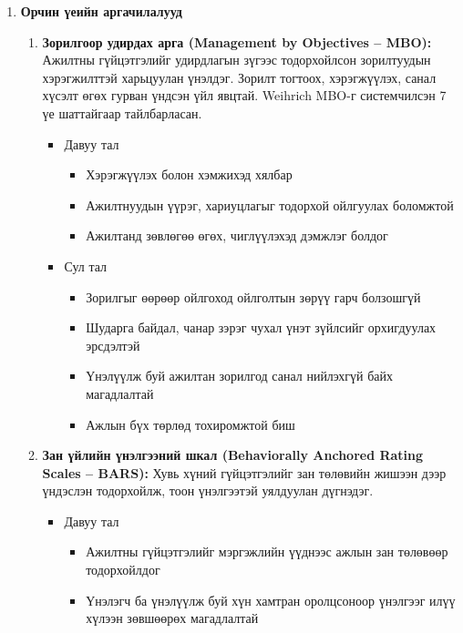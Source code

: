 \begin{enumerate}
\begin{enumerate}
    \end{enumerate}
    \item \textbf{Орчин үеийн аргачилалууд}
    \begin{enumerate}
        \item \textbf{Зорилгоор удирдах арга (Management by Objectives – MBO):} Ажилтны гүйцэтгэлийг 
        удирдлагын зүгээс тодорхойлсон зорилтуудын хэрэгжилттэй харьцуулан үнэлдэг. Зорилт тогтоох, 
        хэрэгжүүлэх, санал хүсэлт өгөх гурван үндсэн үйл явцтай. Weihrich MBO-г системчилсэн 7 үе 
        шаттайгаар тайлбарласан.
        \begin{itemize}
            \item Давуу тал
            \begin{itemize}
                \item Хэрэгжүүлэх болон хэмжихэд хялбар
                \item Ажилтнуудын үүрэг, хариуцлагыг тодорхой ойлгуулах боломжтой
                \item Ажилтанд зөвлөгөө өгөх, чиглүүлэхэд дэмжлэг болдог
            \end{itemize}
            \item Сул тал
            \begin{itemize}
                \item Зорилгыг өөрөөр ойлгоход ойлголтын зөрүү гарч болзошгүй
                \item Шударга байдал, чанар зэрэг чухал үнэт зүйлсийг орхигдуулах эрсдэлтэй
                \item Үнэлүүлж буй ажилтан зорилгод санал нийлэхгүй байх магадлалтай
                \item Ажлын бүх төрлөд тохиромжтой биш
            \end{itemize}
        \end{itemize}
        \item \textbf{Зан үйлийн үнэлгээний шкал (Behaviorally Anchored Rating Scales – BARS):} Хувь хүний 
        гүйцэтгэлийг зан төлөвийн жишээн дээр үндэслэн тодорхойлж, тоон үнэлгээтэй уялдуулан дүгнэдэг.
        \begin{itemize}
            \item Давуу тал
            \begin{itemize}
                \item Ажилтны гүйцэтгэлийг мэргэжлийн үүднээс ажлын зан төлөвөөр тодорхойлдог
                \item Үнэлэгч ба үнэлүүлж буй хүн хамтран оролцсоноор үнэлгээг илүү хүлээн зөвшөөрөх магадлалтай

\end{itemize}
\end{itemize}
\end{enumerate}
\end{enumerate}
